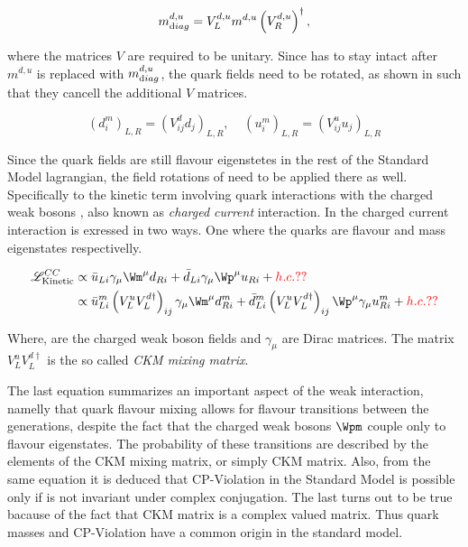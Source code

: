 \begin{equation}
  m^{d,u}_{\text diag} = V_L^{d,u} m^{d,u} \left(V_R^{d,u}\right)^{\dagger},
  \label{diagM}
\end{equation}

\noindent where the matrices $V$ are required to be unitary. Since  has to stay intact after $m^{d,u}$ is replaced with
$m^{d,u}_{\text diag}$, the quark fields need to be rotated, as shown in  such that they cancell the additional $V$ matrices.

\begin{equation}
  \left( d_{i}^m \right)_{L,R} = \left( V^d_{ij} d_{j} \right)_{L,R}, \;\;\;\; \left( u_{i}^m \right)_{L,R} = \left( V^u_{ij} u_{j} \right)_{L,R}
  \label{quark_rotation}
\end{equation}

\noindent Since the quark fields are still flavour eigenstetes in the rest of the Standard Model lagrangian,
the field rotations of  need to be applied there as well. Specifically
to the kinetic term involving quark interactions with the charged weak bosons \Wpm, also known as {\it charged current}
interaction. In  the charged current interaction is exressed in two ways. One where the quarks
are flavour and mass eigenstates respectivelly.

\begin{align}
  \mathscr{L}_{\text{Kinetic}}^{CC} &\propto \bar{u}_{Li} \gamma_\mu {\Wm}^\mu d_{Ri} + \bar{d}_{Li} \gamma_\mu {\Wp}^\mu u_{Ri} + {\color{red} h.c.??}  \\
                               &\propto \bar{u}_{Li}^m \left( V^u_LV^{d\dagger}_L\right)_{ij} \gamma_\mu {\Wm}^\mu d_{Ri}^m + \bar{d}_{Li}^m \left( V^u_LV^{d\dagger}_L\right)_{ij} {\Wp}^\mu \gamma_\mu u_{Ri}^m + {\color{red} h.c.??} \nonumber \\
  \label{CClagrangian}
\end{align}

\noindent Where, \Wpm are the charged weak boson fields and $\gamma_\mu$ are Dirac matrices.
The matrix $V^u_LV^{d\dagger}_L$ is the so called {\it CKM mixing matrix}.

The last equation summarizes an important aspect of the weak interaction, namelly that
quark flavour mixing allows for flavour transitions between the generations,
despite the fact that the charged weak bosons $\Wpm$ couple only to flavour eigenstates.
The probability of these transitions are described by the elements of the CKM mixing matrix,
or simply CKM matrix. Also, from the same equation it is deduced that CP-Violation in the Standard Model is possible
only if  is not invariant under complex conjugation. The last turns out to be true
bacause of the fact that CKM matrix is a complex valued matrix. Thus quark masses and CP-Violation
have a common origin in the standard model.

